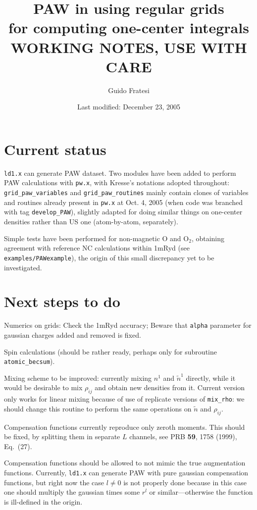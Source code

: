 \documentclass[a4paper,twocolumn,12pt]{article}
\title{PAW in \var{pw.x} using regular grids\\for computing one-center
integrals\\WORKING NOTES, USE WITH CARE}
\author{Guido Fratesi}
\date{Last modified: December 23, 2005}
\newcommand{\var}[1]{{\tt #1}}
\begin{document}
\maketitle

\section*{Current status}

\var{ld1.x} can generate PAW dataset.  Two modules have been added to
perform PAW calculations with \var{pw.x}, with Kresse's notations
adopted throughout: \var{grid\_paw\_variables} and
\var{grid\_paw\_routines} mainly contain clones of variables and
routines already present in \var{pw.x} at Oct. 4, 2005 (when code was
branched with tag \var{develop\_PAW}), slightly adapted for doing
similar things on one-center densities rather than US one
(atom-by-atom, separately).

Simple tests have been performed for non-magnetic O and O$_2$,
obtaining agreement with reference NC calculations within 1mRyd (see
\var{examples/PAWexample}), the origin of this small discrepancy yet
to be investigated.

\section*{Next steps to do}

Numerics on grids: Check the 1mRyd accuracy; Beware that \var{alpha}
parameter for gaussian charges added and removed is fixed.

Spin calculations (should be rather ready, perhaps only for subroutine
\var{atomic\_becsum}).

Mixing scheme to be improved: currently mixing $n^1$ and $\tilde{n}^1$
directly, while it would be desirable to mix $\rho_{ij}$ and obtain
new densities from it.  Current version only works for linear mixing
because of use of replicate versions of \var{mix\_rho}: we should
change this routine to perform the same operations on $\tilde{n}$ and
$\rho_{ij}$.

Compensation functions currently reproduce only zeroth moments.  This
should be fixed, by splitting them in separate $L$ channels, see PRB
{\bf 59}, 1758 (1999), Eq.~(27).

Compensation functions should be allowed to not mimic the true
augmentation functions.  Currently, \var{ld1.x} can generate PAW with
pure gaussian compensation functions, but right now the case $l\neq0$
is not properly done because in this case one should multiply the
gaussian times some $r^l$ or similar---otherwise the function is
ill-defined in the origin.
\end{document}
